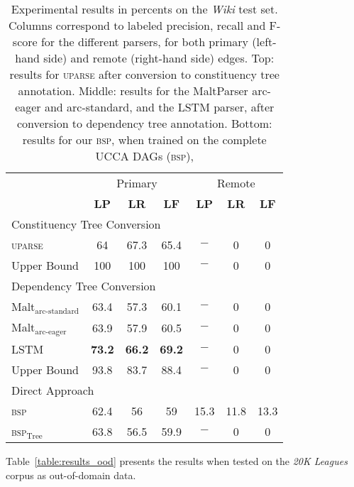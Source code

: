 \documentclass[11pt]{article}
\newcommand{\tabref}[1]{Table~\ref{#1}}
\begin{document}
\begin{table}[ht!]
  \centering
\begin{tabular}{l|ccc|ccc}
& \multicolumn{3}{c|}{Primary} & \multicolumn{3}{c}{Remote} \\
& \textbf{LP} & \textbf{LR} & \textbf{LF} & \textbf{LP} & \textbf{LR} & \textbf{LF} \\
\hline
\multicolumn{4}{l}{\rule{0pt}{2ex} \footnotesize Constituency Tree Conversion} \\
\textsc{uparse} & 64 & 67.3 & 65.4 & $-$ & 0 & 0 \\
Upper Bound & 100 & 100 & 100 & $-$ & 0 & 0 \\
\hline
\multicolumn{4}{l}{\rule{0pt}{4ex} \footnotesize Dependency Tree Conversion} \\
Malt$_{\textrm{arc-standard}}$ & 63.4 & 57.3 & 60.1 & $-$ & 0 & 0 \\
Malt$_{\textrm{arc-eager}}$ & 63.9 & 57.9 & 60.5 & $-$ & 0 & 0 \\
LSTM & {\bf 73.2} & {\bf 66.2} & {\bf 69.2} & $-$ & 0 & 0 \\
Upper Bound & 93.8 & 83.7 & 88.4 & $-$ & 0 & 0 \\
\hline
\multicolumn{4}{l}{\rule{0pt}{4ex} \footnotesize Direct Approach} \\
\textsc{bsp} & 62.4 & 56 & 59 & 15.3 & 11.8 & 13.3 \\
\textsc{bsp}$_{\mathrm{Tree}}$ & 63.8 & 56.5 & 59.9 & $-$ & 0 & 0 \\
\end{tabular}
\caption{
  Experimental results in percents on the \textit{Wiki} test set. Columns correspond to labeled precision,
  recall and F-score for the different parsers, for both primary (left-hand side)
  and remote (right-hand side) edges. Top: results for \textsc{uparse}
  after conversion to constituency tree annotation. Middle: results for the
  MaltParser arc-eager and arc-standard, and
  the LSTM parser, after conversion to dependency tree annotation.
  Bottom: results for our \textsc{bsp}, when trained on the complete UCCA DAGs (\textsc{bsp}),
}
\label{table:results}

\tabref{table:results_ood} presents the results when tested on the \textit{20K Leagues} corpus as out-of-domain data.

\end{table}
\end{document}
